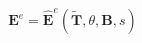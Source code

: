 \documentclass[preview]{standalone}
\begin{document}
\begin{align*}
\mathbf{E}^e = \hat{\mathbf{E}}^e(\tilde{\mathbf{T}}, \theta, \mathbf{B}, s)
\end{align*}
\end{document}
